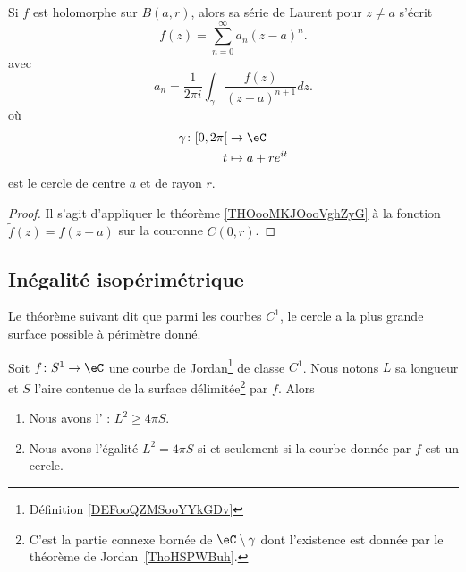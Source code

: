 \begin{proposition}     \label{PROPooBMZGooLoaGLK}
	Si \( f\) est holomorphe sur \( B(a,r)\), alors sa série de Laurent pour \( z\neq a\) s'écrit
	\begin{equation}
		f(z)=\sum_{n=0}^{\infty}a_n(z-a)^n.
	\end{equation}
	avec
	\begin{equation}
		a_n=\frac{1}{ 2\pi i }\int_{\gamma}\frac{ f(z) }{ (z-a)^{n+1} }dz.
	\end{equation}
	où
	\begin{equation}
		\begin{aligned}
			\gamma\colon \mathopen[ 0 , 2\pi \mathclose[ & \to \eC            \\
			t                                            & \mapsto a+ re^{it}
		\end{aligned}
	\end{equation}
	est le cercle de centre \( a\) et de rayon \( r\).
\end{proposition}

\begin{proof}
	Il s'agit d'appliquer le théorème \ref{THOooMKJOooVghZyG} à la fonction \( \tilde f(z)=f(z+a)\) sur la couronne \( C(0,r)\).
\end{proof}

\subsection{Inégalité isopérimétrique}

Le théorème suivant dit que parmi les courbes \( C^1\), le cercle a la plus grande surface possible à périmètre donné.
\begin{theorem}    \label{ThoIXyctPo}
	Soit \( f\colon S^1\to \eC \) une courbe de Jordan\footnote{Définition \ref{DEFooQZMSooYYkGDv}} de classe \( C^1\). Nous notons \( L\) sa longueur et \( S\) l'aire contenue de la surface délimitée\footnote{C'est la partie connexe bornée de \( \eC\setminus\gamma\) dont l'existence est donnée par le théorème de Jordan~\ref{ThoHSPWBuh}.} par \( f\). Alors
	\begin{enumerate}
		\item
		      Nous avons l' : \( L^2\geq 4\pi S\).
		\item
		      Nous avons l'égalité \( L^2=4\pi S\) si et seulement si la courbe donnée par \( f\) est un cercle.
	\end{enumerate}
\end{theorem}

